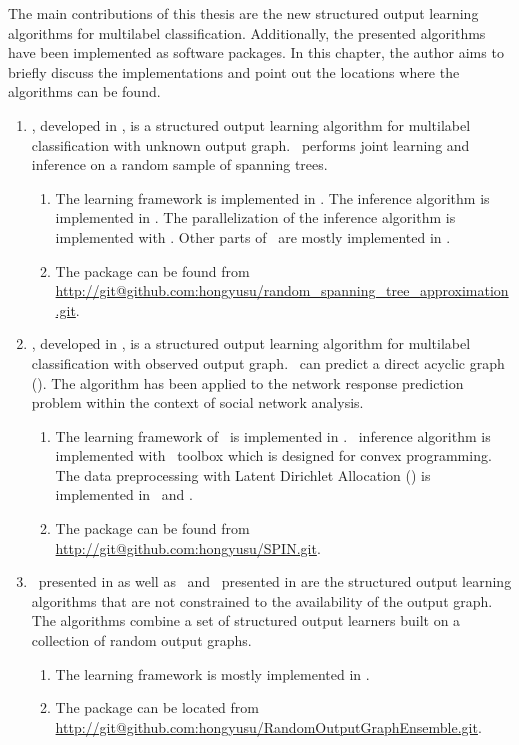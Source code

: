 {The main contributions of this thesis are the new structured output learning algorithms for multilabel classification.
Additionally, the presented algorithms have been implemented as software packages.
In this chapter, the author aims to briefly discuss the implementations and point out the locations where the algorithms can be found.

\begin{enumerate}
	\item \rta, developed in , is a structured output learning algorithm for multilabel classification with unknown output graph. \rta\ performs joint learning and inference on a random sample of spanning trees.
	\begin{enumerate}
		\item The learning framework is implemented in \matlab. The inference algorithm is implemented in \cpp. The parallelization of the inference algorithm is implemented with \openmp. Other parts of \rta\ are mostly implemented in \matlab.
		\item The package can be found from \url{http://git@github.com:hongyusu/random_spanning_tree_approximation.git}.
	\end{enumerate}
	
	\item \spin, developed in , is a structured output learning algorithm for multilabel classification with observed output graph. \spin\ can predict a direct acyclic graph (\daggraph). The algorithm has been applied to the network response prediction problem within the context of social network analysis.
	\begin{enumerate}
		\item The learning framework of \spin\ is implemented in \matlab. \sdp\ inference algorithm is implemented with \cvx\ toolbox which is designed for convex programming. The data preprocessing with Latent Dirichlet Allocation (\lda) \citep{Blei03latent} is implemented in \python\ and \matlab.
		\item The package can be found from \url{http://git@github.com:hongyusu/SPIN.git}.
	\end{enumerate}
	
	\item \mve\ presented in  as well as \amm\ and \mam\ presented in  are the structured output learning algorithms that are not constrained to the availability of the output graph. The algorithms combine a set of structured output learners built on a collection of random output graphs.
	\begin{enumerate}
		\item The learning framework is mostly implemented in \matlab.
		\item The package can be located from \url{http://git@github.com:hongyusu/RandomOutputGraphEnsemble.git}.
	\end{enumerate}
\end{enumerate}




}
